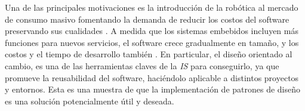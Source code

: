 Una de las principales motivaciones es la introducción de la robótica al mercado de consumo masivo fomentando la demanda de reducir los costos del software preservando sus cualidades \cite{Brugali2009}. A medida que los sistemas embebidos incluyen más funciones para nuevos servicios, el software crece gradualmente en tamaño, y los costos y el tiempo de desarrollo también \cite{model2}. En particular, el diseño orientado al cambio, es una de las herramientas claves de la \textit{IS} para conseguirlo, ya que promueve la reusabilidad del software, haciéndolo aplicable a distintos proyectos y entornos. Esta es una muestra de que la implementación de patrones de diseño es una solución potencialmente útil y deseada.

